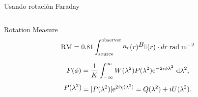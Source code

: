 \documentclass[xetex,aspectratio=169]{beamer}
\newcommand{\mypos}[2]{\tikz[remember picture]{\node[inner sep=0pt, anchor=base](#2){#1};}}
\begin{document}
	\begin{frame}{Usando rotación Faraday}
		\begin{columns}
			
			\begin{column}{0.55\textwidth}
				
				
				
				\begin{block}{Rotation Measure}
					\begin{equation*}
						\mypos{\text{RM}}{rm} = 0.81 \int_{\text{source}}^{\text{observer}} \mypos{$n_e$}{ne}(r) \mypos{$B_{||}$}{be}(r) \cdot dr\; \text{rad}\;\text{m}^{-2}
					\end{equation*}
				\end{block}
				
				\begin{equation*}
					F(\phi) = \frac{1}{K} \int_{-\infty}^{\infty}{ W(\lambda^2)P(\lambda^2){\rm e}^{-2i\phi \lambda^2}~{\rm d}\lambda^2 },
				\end{equation*}
				\begin{equation*}
					\mypos{$P(\lambda^2)$}{ppos} = |P(\lambda^2)|{\rm e}^{2i\chi(\lambda^2)} = Q(\lambda^2) + iU(\lambda^2).
				\end{equation*}
			\end{column}
			

\end{columns}
\end{frame}
\end{document}
